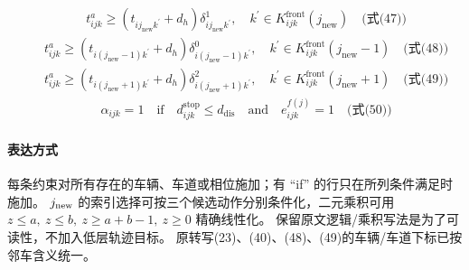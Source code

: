 \documentclass[UTF8,11pt]{ctexart}
\begin{document}
\[\begin{aligned}&\quad t^{a}_{ijk} \geq (t_{ij_{\text{new}}k^{\prime}} + d_{h})\delta^{1}_{ij_{\text{new}}k^{\prime}}, \quad k^{\prime} \in K^{\text{front}}_{ijk}(j_{\text{new}}) \quad \text{(式(47))}\end{aligned}\]
\[\begin{aligned}&\quad t^{a}_{ijk} \geq (t_{i(j_{\text{new}}-1)k^{\prime}} + d_{h})\delta^{0}_{i(j_{\text{new}}-1)k^{\prime}}, \quad k^{\prime} \in K^{\text{front}}_{ijk}(j_{\text{new}}-1) \quad \text{(式(48))}\end{aligned}\]
\[\begin{aligned}&\quad t^{a}_{ijk} \geq (t_{i(j_{\text{new}}+1)k^{\prime}} + d_{h})\delta^{2}_{i(j_{\text{new}}+1)k^{\prime}}, \quad k^{\prime} \in K^{\text{front}}_{ijk}(j_{\text{new}}+1) \quad \text{(式(49))}\end{aligned}\]
\[\begin{aligned}&\quad \alpha_{ijk} = 1 \quad \text{if} \quad d^{\text{stop}}_{ijk} \leq d_{\text{dis}} \quad \text{and} \quad e^{f(j)}_{ijk} = 1 \quad \text{(式(50))}\end{aligned}\]
\paragraph{表达方式}
每条约束对所有存在的车辆、车道或相位施加；有 ``if'' 的行只在所列条件满足时施加。
$j_{\rm new}$ 的索引选择可按三个候选动作分别条件化，二元乘积可用
$z\le a,\ z\le b,\ z\ge a+b-1,\ z\ge0$ 精确线性化。
保留原文逻辑/乘积写法是为了可读性，不加入低层轨迹目标。
原转写(23)、(40)、(48)、(49)的车辆/车道下标已按邻车含义统一。
\end{document}
